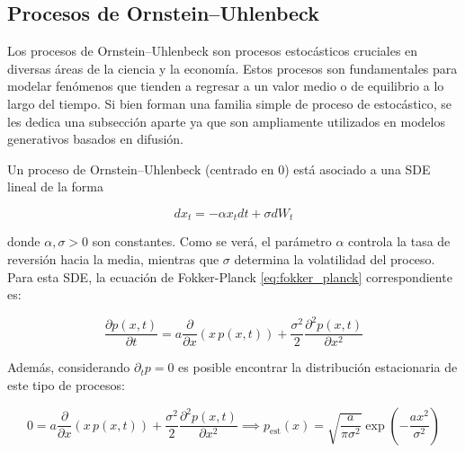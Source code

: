 


\subsection{Procesos de Ornstein–Uhlenbeck}

Los procesos de Ornstein–Uhlenbeck son procesos estocásticos cruciales en diversas áreas de la ciencia y la economía. Estos procesos son fundamentales para modelar fenómenos que tienden a regresar a un valor medio o de equilibrio a lo largo del tiempo. Si bien forman una familia simple de proceso de estocástico, se les dedica una subsección aparte ya que son ampliamente utilizados en modelos generativos basados en difusión.

Un proceso de Ornstein–Uhlenbeck (centrado en 0) está asociado a una SDE lineal de la forma

\begin{equation*}
    dx_t = -\alpha x_t dt + \sigma dW_t
\end{equation*}

donde $\alpha, \sigma > 0$ son constantes. Como se verá, el parámetro $\alpha$ controla la tasa de reversión hacia la media, mientras que $\sigma$ determina la volatilidad del proceso. Para esta SDE, la ecuación de Fokker-Planck \eqref{eq:fokker_planck} correspondiente es:

\begin{equation*}
    \frac{\partial p(x,t)}{\partial t} = a\frac{\partial}{\partial x} (x\, p(x, t)) + \frac{\sigma^2}{2} \frac{\partial^{2}p(x, t)}{\partial x^2}
\end{equation*}

Además, considerando $\partial_{t}p=0$ es posible encontrar la distribución estacionaria de este tipo de procesos:

\begin{equation*}
    0 = a\frac{\partial}{\partial x} (x\, p(x, t)) + \frac{\sigma^2}{2} \frac{\partial^{2}p(x, t)}{\partial x^2}
    \implies
    p_{\operatorname{est}}(x) = \sqrt{\frac{a}{\pi\sigma^{2}}}\exp\left(-\frac{ax^2}{\sigma^2}\right)
\end{equation*}

